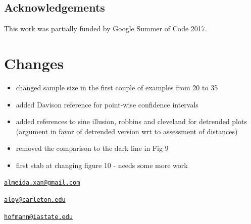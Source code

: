 

\subsection{Acknowledgements}\label{acknowledgements}

This work was partially funded by Google Summer of Code 2017.

\section{Changes}\label{changes}

\begin{itemize}
\tightlist
\item
  changed sample size in the first couple of examples from 20 to 35
\item
  added Davison reference for point-wise confidence intervals
\item
  added references to sine illusion, robbins and cleveland for detrended
  plots (argument in favor of detrended version wrt to assessment of
  distances)
\item
  removed the comparison to the dark line in Fig 9
\item
  first stab at changing figure 10 - needs some more work
\end{itemize}

\address{%
Alexandre Almeida\\
University of Campinas\\
Institute of Computing\\ Campinas, Brazil 13083-852\\
}
\href{mailto:almeida.xan@gmail.com}{\nolinkurl{almeida.xan@gmail.com}}

\address{%
Adam Loy\\
Carleton College\\
Department of Mathematics and Statistics\\ Northfield, MN 55057\\
}
\href{mailto:aloy@carleton.edu}{\nolinkurl{aloy@carleton.edu}}

\address{%
Heike Hofmann\\
Iowa State University\\
Department of Statistics\\ Ames, IA 50011-1210\\
}
\href{mailto:hofmann@iastate.edu}{\nolinkurl{hofmann@iastate.edu}}


